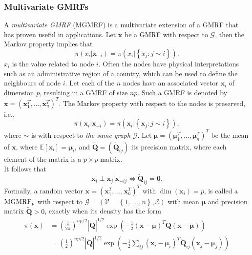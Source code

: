 \subsubsection{Multivariate GMRFs}
A \textit{multivariate GMRF} (MGMRF) is a multivariate extension of a GMRF that has proven useful in applications. Let $\pmb{x}$ be a GMRF with respect to $\mathcal{G}$, then the Markov property implies that
\begin{equation*}
    \pi\left(x_i|\pmb{x}_{-i}\right)=\pi\left(x_i|\left\lbrace x_j:j\sim i\right\rbrace\right).
\end{equation*}
$x_i$ is the value related to node $i$. Often the nodes have physical interpretations such as an administrative region of a country, which can be used to define the neighbours of node $i$. Let each of the $n$ nodes have an associated vector $\pmb{x}_i$ of dimension $p$, resulting in a GMRF of size $np$. Such a GMRF is denoted by $\pmb{x}=\left(\pmb{x}_1^T,...,\pmb{x}_n^T\right)^T$. The Markov property with respect to the nodes is preserved, i.e.,
\begin{equation*}
    \pi\left(\pmb{x}_i|\pmb{x}_{-i}\right)=\pi\left(\pmb{x}_i|\left\lbrace\pmb{x}_{j}:j\sim i\right\rbrace\right),
\end{equation*}
where $\sim$ is with respect to \textit{the same graph} $\mathcal{G}$. Let $\pmb{\mu}=\left(\pmb{\mu}_1^T,... ,\pmb{\mu}_n^T\right)^T$ be the mean of $\pmb{x}$, where $\mathbb{E}\left[\pmb{x}_i\right]=\pmb{\mu}_i$, and $\widetilde{\pmb{Q}}=\left(\widetilde{\pmb{Q}}_{ij}\right)$ its precision matrix, where each element of the matrix is a $p\times p$ matrix. \\
It follows that
\begin{equation*}
    \pmb{x}_i\perp\pmb{x}_j|\pmb{x}_{-ij}\Longleftrightarrow\widetilde{\pmb{Q}}_{ij}=\pmb{0}.
\end{equation*}
Formally, a random vector $\pmb{x}=\left(\pmb{x}_1^T,...,\pmb{x}_n^T\right)^T$ with $\dim\left(\pmb{x}_i\right)=p$, is called a $\hbox{MGMRF}_p$ with respect to $\mathcal{G}=\left(\mathcal{V}=\left\lbrace 1,. ...,n\right\rbrace,\mathcal{E}\right)$ with mean $\pmb{\mu}$ and precision matrix $\widetilde{\pmb{Q}} >0$, exactly when its density has the form
\begin{align*}
    \pi\left(\pmb{x}\right) &=\left(\frac{1}{2\pi}\right)^{np/2}\left|\widetilde{\pmb{Q}}\right|^{1/2}\exp\left(-\frac{1}{2}\left(\pmb{x}-\pmb{\mu}\right)^T\widetilde{\pmb{Q}}\left(\pmb{x}-\pmb{\mu}\right)\right)\\
    &=\left(\frac{1}{2}\right)^{np/2}\left|\widetilde{\pmb{Q}}\right|^{1/2}\exp\left(-\frac{1}{2}\sum_{ij}\left(\pmb{x}_i-\pmb{\mu}_i\right)^T\widetilde{\pmb{Q}}_{ij}\left(\pmb{x}_j-\pmb{\mu}_j\right)\right)
\end{align*}
